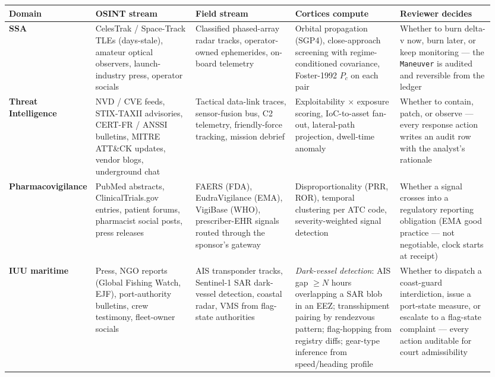 \begin{longtable}{@{}p{0.11\linewidth}p{0.21\linewidth}p{0.21\linewidth}p{0.22\linewidth}p{0.20\linewidth}@{}}
\toprule
\textbf{Domain} & \textbf{OSINT stream} & \textbf{Field stream} & \textbf{Cortices compute} & \textbf{Reviewer decides} \\
\midrule
\endhead

\textbf{SSA} &
CelesTrak / Space-Track TLEs (days-stale), amateur optical observers, launch-industry press, operator socials &
Classified phased-array radar tracks, operator-owned ephemerides, on-board telemetry &
Orbital propagation (SGP4), close-approach screening with regime-conditioned covariance, Foster-1992 $P_c$ on each pair &
Whether to burn delta-v now, burn later, or keep monitoring --- the \texttt{Maneuver} is audited and reversible from the ledger \\

\textbf{Threat Intelligence} &
NVD / CVE feeds, STIX-TAXII advisories, CERT-FR / ANSSI bulletins, MITRE ATT\&CK updates, vendor blogs, underground chat &
Tactical data-link traces, sensor-fusion bus, C2 telemetry, friendly-force tracking, mission debrief &
Exploitability $\times$ exposure scoring, IoC-to-asset fan-out, lateral-path projection, dwell-time anomaly &
Whether to contain, patch, or observe --- every response action writes an audit row with the analyst's rationale \\

\textbf{Pharmacovigilance} &
PubMed abstracts, ClinicalTrials.gov entries, patient forums, pharmacist social posts, press releases &
FAERS (FDA), EudraVigilance (EMA), VigiBase (WHO), prescriber-EHR signals routed through the sponsor's gateway &
Disproportionality (PRR, ROR), temporal clustering per ATC code, severity-weighted signal detection &
Whether a signal crosses into a regulatory reporting obligation (EMA good practice --- not negotiable, clock starts at receipt) \\

\textbf{IUU maritime} &
Press, NGO reports (Global Fishing Watch, EJF), port-authority bulletins, crew testimony, fleet-owner socials &
AIS transponder tracks, Sentinel-1 SAR dark-vessel detection, coastal radar, VMS from flag-state authorities &
\emph{Dark-vessel detection}: AIS gap $\geq N$ hours overlapping a SAR blob in an EEZ; transshipment pairing by rendezvous pattern; flag-hopping from registry diffs; gear-type inference from speed/heading profile &
Whether to dispatch a coast-guard interdiction, issue a port-state measure, or escalate to a flag-state complaint --- every action auditable for court admissibility \\


\end{longtable}
